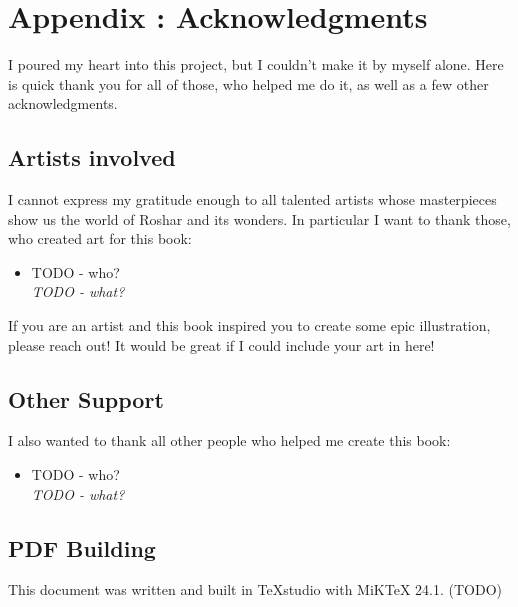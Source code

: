 \chapter{Appendix \thechapter{}: Acknowledgments}
\label{chap:acknowledgments}

I poured my heart into this project, but I couldn't make it by myself alone. Here is quick thank you for all of those, who helped me do it, as well as a few other acknowledgments. 

\section{Artists involved}

I cannot express my gratitude enough to all talented artists whose masterpieces show us the world of Roshar and its wonders. In particular I want to thank those, who created art for this book:

\begin{itemize}
	\item TODO - who? \\
	\textit{TODO - what?}
\end{itemize}

If you are an artist and this book inspired you to create some epic illustration, please reach out! It would be great if I could include your art in here!

\section{Other Support}

I also wanted to thank all other people who helped me create this book:

\begin{itemize}
	\item TODO - who? \\
	\textit{TODO - what?} 
\end{itemize}


\section{PDF Building} 

This document was written and built in TeXstudio with MiKTeX 24.1. (TODO)

